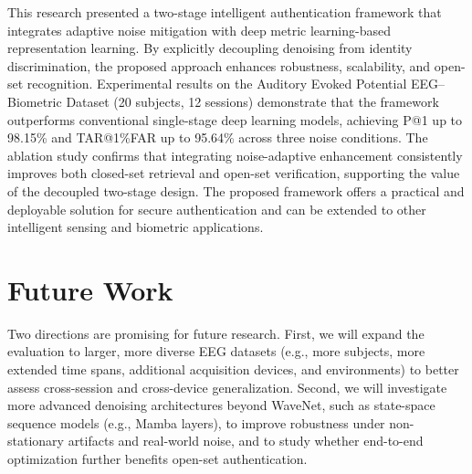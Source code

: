 \documentclass[conference]{IEEEtran}
\begin{document}
This research presented a two-stage intelligent authentication framework that integrates adaptive noise mitigation with deep metric learning-based representation learning. By explicitly decoupling denoising from identity discrimination, the proposed approach enhances robustness, scalability, and open-set recognition. Experimental results on the Auditory Evoked Potential EEG--Biometric Dataset (20 subjects, 12 sessions) demonstrate that the framework outperforms conventional single-stage deep learning models, achieving P@1 up to 98.15\% and TAR@1\%FAR up to 95.64\% across three noise conditions. The ablation study confirms that integrating noise-adaptive enhancement consistently improves both closed-set retrieval and open-set verification, supporting the value of the decoupled two-stage design. The proposed framework offers a practical and deployable solution for secure authentication and can be extended to other intelligent sensing and biometric applications.

\section{Future Work}

Two directions are promising for future research. First, we will expand the evaluation to larger, more diverse EEG datasets (e.g., more subjects, more extended time spans, additional acquisition devices, and environments) to better assess cross-session and cross-device generalization. Second, we will investigate more advanced denoising architectures beyond WaveNet, such as state-space sequence models (e.g., Mamba layers), to improve robustness under non-stationary artifacts and real-world noise, and to study whether end-to-end optimization further benefits open-set authentication.
\end{document}
